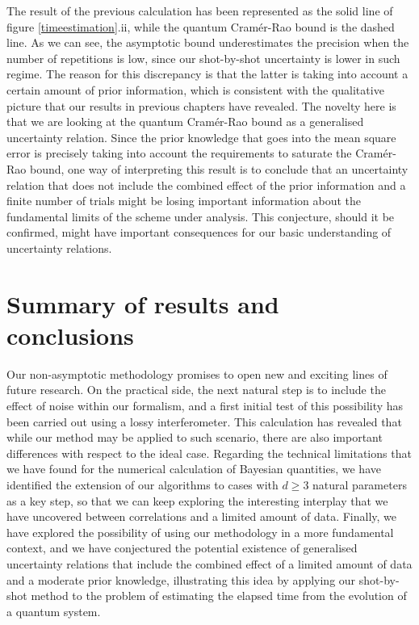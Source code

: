 The result of the previous calculation has been represented as the solid line of figure \ref{timeestimation}.ii, while the quantum Cram\'{e}r-Rao bound is the dashed line. As we can see, the asymptotic bound underestimates the precision when the number of repetitions is low, since our shot-by-shot uncertainty is lower in such regime. The reason for this discrepancy is that the latter is taking into account a certain amount of prior information, which is consistent with the qualitative picture that our results in previous chapters have revealed. The novelty here is that we are looking at the quantum Cram\'{e}r-Rao bound as a generalised uncertainty relation. Since the prior knowledge that goes into the mean square error is precisely taking into account the requirements to saturate the Cram\'{e}r-Rao bound, one way of interpreting this result is to conclude that an uncertainty relation that does not include the combined effect of the prior information and a finite number of trials might be losing important information about the fundamental limits of the scheme under analysis. This conjecture, should it be confirmed, might have important consequences for our basic understanding of uncertainty relations.  

\section{Summary of results and conclusions}

Our non-asymptotic methodology promises to open new and exciting lines of future research. On the practical side, the next natural step is to include the effect of noise within our formalism, and a first initial test of this possibility has been carried out using a lossy interferometer. This calculation has revealed that while our method may be applied to such scenario, there are also important differences with respect to the ideal case. Regarding the technical limitations that we have found for the numerical calculation of Bayesian quantities, we have identified the extension of our algorithms to cases with $d\geqslant 3 $ natural parameters as a key step, so that we can keep exploring the interesting interplay that we have uncovered between correlations and a limited amount of data. Finally, we have explored the possibility of using our methodology in a more fundamental context, and we have conjectured the potential existence of generalised uncertainty relations that include the combined effect of a limited amount of data and a moderate prior knowledge, illustrating this idea by applying our shot-by-shot method to the problem of estimating the elapsed time from the evolution of a quantum system. 